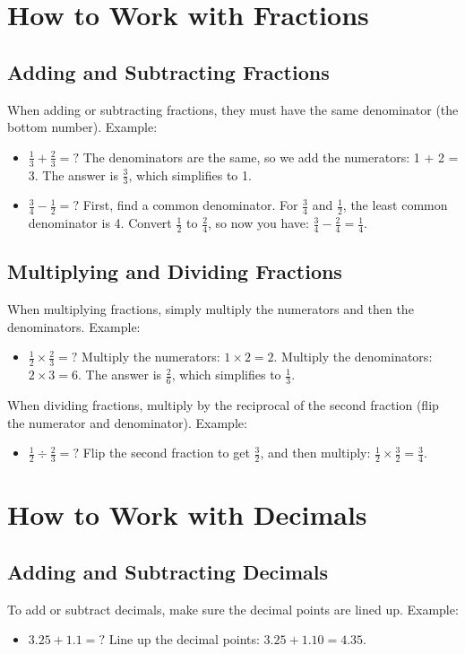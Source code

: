 \section{How to Work with Fractions}
\subsection{Adding and Subtracting Fractions}
When adding or subtracting fractions, they must have the same denominator (the bottom number). Example:
\begin{itemize}
    \item $\frac{1}{3} + \frac{2}{3} = ?$ The denominators are the same, so we add the numerators: 1 + 2 = 3. The answer is $\frac{3}{3}$, which simplifies to 1.
    \item $\frac{3}{4} - \frac{1}{2} = ?$ First, find a common denominator. For $\frac{3}{4}$ and $\frac{1}{2}$, the least common denominator is 4. Convert $\frac{1}{2}$ to $\frac{2}{4}$, so now you have: $\frac{3}{4} - \frac{2}{4} = \frac{1}{4}$.
\end{itemize}

\subsection{Multiplying and Dividing Fractions}
When multiplying fractions, simply multiply the numerators and then the denominators. Example:
\begin{itemize}
    \item $\frac{1}{2} \times \frac{2}{3} = ?$ Multiply the numerators: $1 \times 2 = 2$. Multiply the denominators: $2 \times 3 = 6$. The answer is $\frac{2}{6}$, which simplifies to $\frac{1}{3}$.
\end{itemize}

When dividing fractions, multiply by the reciprocal of the second fraction (flip the numerator and denominator). Example:
\begin{itemize}
    \item $\frac{1}{2} \div \frac{2}{3} = ?$ Flip the second fraction to get $\frac{3}{2}$, and then multiply: $\frac{1}{2} \times \frac{3}{2} = \frac{3}{4}$.
\end{itemize}

\section{How to Work with Decimals}
\subsection{Adding and Subtracting Decimals}
To add or subtract decimals, make sure the decimal points are lined up. Example:
\begin{itemize}
    \item $3.25 + 1.1 = ?$ Line up the decimal points: $3.25 + 1.10 = 4.35$.
\end{itemize}

